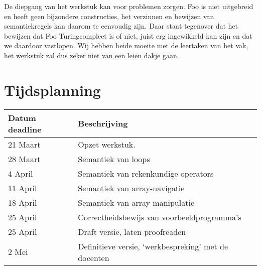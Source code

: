 \documentclass[11pt]{article}
\begin{document}
De diepgang van het werkstuk kan voor problemen zorgen. Foo is niet uitgebreid en heeft geen bijzondere constructies, het verzinnen en bewijzen van semantiekregels kan daarom te eenvoudig zijn. Daar staat tegenover dat het bewijzen dat Foo Turingcompleet is of niet, juist erg ingewikkeld kan zijn en dat we daardoor vastlopen.
\newline
Wij hebben beide moeite met de leertaken van het vak, het werkstuk zal dus zeker niet van een leien dakje gaan.

\section{Tijdsplanning}

\begin{center}
    \begin{tabular}{ | l | p{15cm} |}
    \hline
    Datum deadline & Beschrijving \\ \hline
    21 Maart & Opzet werkstuk. \\ \hline
    28 Maart & Semantiek van loops \\ \hline
    4 April  & Semantiek van rekenkundige operators \\ \hline
    11 April & Semantiek van array-navigatie \\ \hline
    18 April & Semantiek van array-manipulatie \\ \hline
    25 April & Correctheidsbewijs van voorbeeldprogramma's \\ \hline
    25 April & Draft versie, laten proofreaden \\ \hline
    2 Mei    & Definitieve versie, `werkbespreking' met de docenten \\ \hline
    \hline
    \end{tabular}
\end{center}


%
\end{document}
